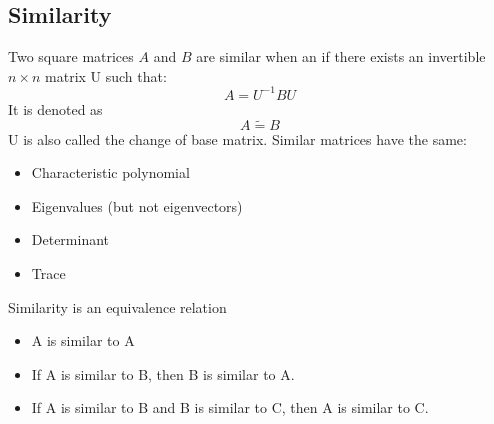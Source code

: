 \documentclass{book}
\begin{document}
\subsection{Similarity}\label{similiarity}
Two square matrices $A$ and $B$ are similar when an if there exists an invertible $n \times n$ matrix U such that:
\begin{equation}
    A = U^{-1}BU
\end{equation}
It is denoted as
\begin{equation*}
    A \tilde{=} B
\end{equation*}
U is also called the change of base matrix.
Similar matrices have the same:
\begin{itemize}
    \item Characteristic polynomial
    \item Eigenvalues (but not eigenvectors)
    \item Determinant
    \item Trace
\end{itemize}
Similarity is an equivalence relation
\begin{itemize}
    \item A is similar to A
    \item If A is similar to B, then B is similar to A.
    \item If A is similar to B and B is similar to C, then A is similar to C.
\end{itemize}
\end{document}
